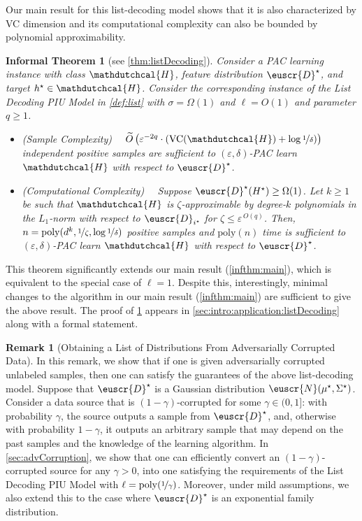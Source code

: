 \documentclass[11pt]{article}
\theoremstyle{plain}
\newtheorem{inftheorem}[theorem]{Informal Theorem}
\theoremstyle{definition}
\newtheorem{remark}[theorem]{Remark}
\theoremstyle{remark}
\newcommand{\inparen}[1]{\left(#1\right)}
\newcommand{\nfrac}[2]{\nicefrac{#1}{#2}}
\newcommand{\poly}{\mathrm{poly}}
\newcommand{\vc}{\textrm{\rm VC}}
\newcommand{\eps}{\varepsilon}
\newcommand{\wt}[1]{\widetilde{#1}}
\newcommand{\customcal}[1]{\euscr{#1}}
\newcommand{\cD}{\customcal{D}}
\newcommand{\cN}{\customcal{N}}
\newcommand{\hypo}[1]{\mathdutchcal{#1}}
\newcommand{\hyH}{\hypo{H}}
\newcommand{\optset}{{H^\star}}
\newcommand{\cDtrue}{\cD^\star}
\newcommand{\muStar}{\mu^\star}
\newcommand{\SigmaStar}{\Sigma^\star}
\newcommand{\nL}{L}
\begin{document}
Our main result for this list-decoding model shows that it is also characterized by VC dimension and its computational complexity can also be bounded by polynomial approximability.
\begin{inftheorem}[see \cref{thm:listDecoding}]\label{infthm:list}
    Consider a PAC learning instance with      
        class $\hyH$,
        feature distribution $\cDtrue$, and 
        target $h^\star\in \hyH$.  
    Consider the corresponding instance of the List Decoding PIU Model in \cref{def:list} with $\sigma=\Omega(1)$ and $\ell=O(1)$ and parameter $q\geq 1$.
    \begin{itemize}
        \item[$\triangleright$] \textit{(Sample Complexity)}~~ 
            $\wt{O}\inparen{\eps^{-2q}\cdot \inparen{\vc{}(\hyH)+\log{\nfrac{1}{\delta}}}}$ independent positive samples are sufficient to $(\eps,\delta)$-PAC learn $\hyH$ with respect to $\cDtrue$.
        \item[$\triangleright$] \textit{(Computational Complexity)}~~
            Suppose $\cDtrue(\optset)\geq \Omega(1)$.
            Let $k\geq 1$ be such that $\hyH$ is $\zeta$-approximable by degree-$k$ polynomials in the $\nL_1$-norm with respect to $\cD_{i^\star}$ for $\zeta\leq \eps^{\,O(q)}$.
            Then, $n=\poly(d^k,\nfrac{1}{\zeta},\log{\nfrac{1}{\delta}})$ positive samples and $\poly(n)$ time is sufficient to $(\eps,\delta)$-PAC learn $\hyH$ with respect to $\cDtrue$.
    \end{itemize}
\end{inftheorem}
This theorem significantly extends our main result (\cref{infthm:main}), which is equivalent to the special case of $\ell=1$. Despite this, interestingly, minimal changes to the algorithm in our main result (\cref{infthm:main}) are sufficient to give the above result. The proof of \cref{infthm:list} appears in \cref{sec:intro:application:listDecoding} along with a formal statement.

\begin{remark}[Obtaining a List of Distributions From Adversarially Corrupted Data]\label{rem:list}
  In this remark, we show that if one is given adversarially corrupted unlabeled samples, then one can satisfy the guarantees of the above list-decoding model. Suppose that $\cDtrue$ is a Gaussian distribution $\cN(\muStar,\SigmaStar)$. Consider a data source that is $(1-\gamma)$-corrupted for some $\gamma\in (0,1]$: with probability $\gamma$, the source outputs a sample from $\cDtrue$, and, otherwise with probability $1-\gamma$, it outputs an arbitrary sample that may depend on the past samples and the knowledge of the learning algorithm. In \cref{sec:advCorruption}, we show that one can efficiently convert an $(1-\gamma)$-corrupted source for any $\gamma>0$, into one satisfying the requirements of the List Decoding PIU Model with $\ell= \poly(\nfrac{1}{\gamma})$. Moreover, under mild assumptions, we also extend this to the case where $\cDtrue$ is an exponential family distribution.
\end{remark} 
\end{document}
